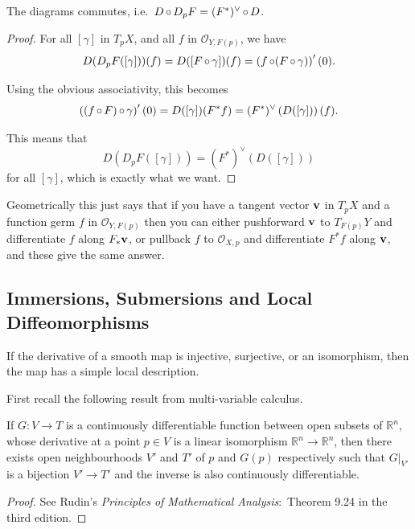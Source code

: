\documentclass[a4paper,11pt]{article}
\begin{document}
	\begin{lem}
		The diagrams commutes, i.e.\ $D \operatorname{\circ} D_p F = (F^*)^{\vee} \operatorname{\circ} D$.
	\end{lem}
	\begin{proof}
		For all $[\gamma]$ in $T_p X$, and all $f$ in $\mathcal{O}_{Y,F(p)}$, we have
		\[
			D(D_p F([\gamma])) (f) = D([F \operatorname{\circ} \gamma]) (f) = \left( f \operatorname{\circ} (F \operatorname{\circ} \gamma) \right)' (0).
		\]
		
		Using the obvious associativity, this becomes
		\[
			\left( (f \operatorname{\circ} F) \operatorname{\circ} \gamma \right)' (0) = D([\gamma]) (F^* f) = (F^*)^{\vee} \left( D([\gamma]) \right) (f).
		\]
		
		This means that
		\[
			D(D_p F([\gamma])) = (F^*)^{\vee} (D([\gamma]))
		\]
		for all $[\gamma]$, which is exactly what we want.
	\end{proof}

	Geometrically this just says that if you have a tangent vector $\vb v$ in $T_p X$ and a function germ $f$ in $\mathcal{O}_{Y,F(p)}$ then you can either pushforward $\vb v$ to $T_{F(p)}Y$ and differentiate $f$ along $F_* \vb v$, or pullback $f$ to $\mathcal{O}_{X,p}$ and differentiate $F^* f$ along $\vb v$, and these give the same answer. 

	\subsection{Immersions, Submersions and Local Diffeomorphisms} 

	If the derivative of a smooth map is injective, surjective, or an isomorphism, then the map has a simple local description.

	First recall the following result from multi-variable calculus.

	\begin{thm}
		If $G : V \to T$ is a continuously differentiable function between open subsets of $\mathbb{R}^n$, whose derivative at a point $p \in V$ is a linear isomorphism $\mathbb{R}^n \to \mathbb{R}^n$, then there exists open neighbourhoods $V'$ and $T'$ of $p$ and $G(p)$ respectively such that $G\big|_{V'}$ is a bijection $V' \to T'$ and the inverse is also continuously differentiable. 
	\end{thm}


	\begin{proof}
		See Rudin's \emph{Principles of Mathematical Analysis}:\ Theorem 9.24 in the third edition.
	\end{proof}
\end{document}
